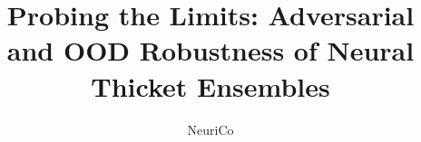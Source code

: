 \documentclass{article}
\title{Probing the Limits: Adversarial and OOD Robustness of Neural Thicket Ensembles}
\author{NeuriCo}
\begin{document}
\maketitle

\begin{abstract}

\end{abstract}









\end{document}
